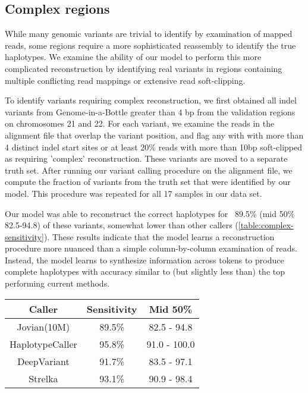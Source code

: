 \documentclass[]{article}
\begin{document}
\subsection{Complex regions}
While many genomic variants are trivial to identify by examination of mapped reads, some regions require a more sophisticated reassembly to identify the true haplotypes. We examine the ability of our model to perform this more complicated reconstruction by identifying real variants in regions containing multiple conflicting read mappings or extensive read soft-clipping. 
 
To identify variants requiring complex reconstruction, we first obtained all indel variants from Genome-in-a-Bottle greater than 4 bp from the validation regions on chromosomes 21 and 22. For each variant, we examine the reads in the alignment file that overlap the variant position, and flag any with with more than 4 distinct indel start sites or at least 20\% reads with more than 10bp soft-clipped as requiring 'complex' reconstruction. These variants are moved to a separate truth set. After running our variant calling procedure on the alignment file, we compute the fraction of variants from the truth set that were identified by our model. This procedure was repeated for all 17 samples in our data set. 

Our model was able to reconstruct the correct haplotypes for ~89.5\% (mid 50\% 82.5-94.8) of these variants, somewhat lower than other callers (\ref{table:complex-sensitivity}).  These results indicate that the model learns a reconstruction procedure more nuanced than a simple column-by-column examination of reads. Instead, the model learns to synthesize information across tokens to produce complete haplotypes with accuracy similar to (but slightly less than) the top performing current methods. 

\begin{center}
	\begin{tabular}{ ccc }
	 Caller & Sensitivity & Mid 50\%  \\ 
	\hline
	 Jovian(10M) & 89.5\% & 82.5 - 94.8 \\ 
	 HaplotypeCaller & 95.8\% & 91.0 - 100.0  \\ 
	 DeepVariant & 91.7\% & 83.5 - 97.1  \\ 
	 Strelka & 93.1\% & 90.9 - 98.4 \\
	 \hline
	\end{tabular}
	\label{table:complex-sensitivity}
\end{center}
\end{document}
